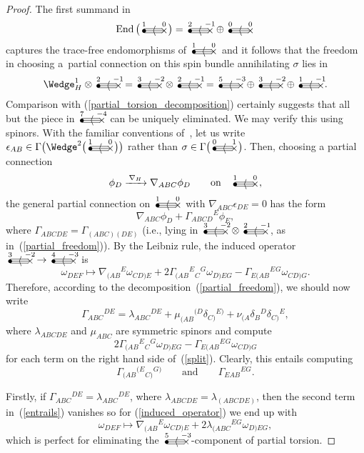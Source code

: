 \documentclass[pdftex]{sigma}%
\numberwithin{equation}{section}
\newcommand{\End}{\operatorname{End}}
\newcommand{\gtwo}[2]{\begin{picture}(28,10)
\put(4,1.1){\makebox(0,0){$\bullet$}}
\put(24,1.5){\makebox(0,0){$\times$}}
\put(4,3.5){\line(1,0){18}}
\put(4,1.5){\line(1,0){20}}
\put(4,-.5){\line(1,0){18}}
\put(14,1.5){\makebox(0,0){$\langle$}}
\put(4,8){\makebox(0,0){$\scriptstyle #1$}}
\put(24,8){\makebox(0,0){$\scriptstyle #2$}}
\end{picture}}
\begin{document}
\begin{proof}
The first summand in
\[\End\big(\gtwo{1}{0}\big)=\gtwo{2}{-1}\oplus\gtwo{0}{0}\]
captures the trace-free endomorphisms of $\gtwo{1}{0}$ and it follows that the
freedom in choosing a~partial connection on this spin bundle annihilating
$\sigma$ lies in
\begin{equation}\label{partial_freedom}
\Wedge_H^1\otimes\gtwo{2}{-1}=\gtwo{3}{-2}\otimes\gtwo{2}{-1}
=\gtwo{5}{-3}\oplus\gtwo{3}{-2}\oplus\gtwo{1}{-1}.\end{equation}
Comparison with (\ref{partial_torsion_decomposition}) certainly suggests that
all but the piece in $\gtwo{7}{-4}$ can be uniquely eliminated. We may verify
this using spinors. With the familiar conventions of~\cite{OT}, let us write
$\epsilon_{AB}\in\Gamma\big({\Wedge}^2\big(\gtwo{1}{0}\big)\big)$ rather than
$\sigma\in\Gamma\big(\gtwo{0}{1}\big)$. Then,
choosing a partial connection
\[\phi_D\xrightarrow{\,\nabla_H\,}\nabla_{ABC}\phi_D\qquad\mbox{on} \quad
\gtwo{1}{0},\]
the general partial connection on $\gtwo{1}{0}$ with
$\nabla_{ABC}\epsilon_{DE}=0$ has the form
\[\nabla_{ABC}\phi_D+\Gamma_{ABCD}{}^E\phi_E,\]
where $\Gamma_{ABCDE}=\Gamma_{(ABC)(DE)}$ (i.e., lying in
$\gtwo{3}{-2}\otimes\gtwo{2}{-1}$, as in~(\ref{partial_freedom})). By the
Leibniz rule, the induced
operator $\gtwo{3}{-2}\to\gtwo{4}{-3}$ is
\begin{equation}\label{induced_operator}
\omega_{DEF}\longmapsto\nabla_{(AB}{}^E\omega_{CD)E}
+2\Gamma_{(AB}{}^E{}_C{}^G\omega_{D)EG}
-\Gamma_{E(AB}{}^E{}^G\omega_{CD)G}.\end{equation}
Therefore, according to the decomposition~(\ref{partial_freedom}), we should
now write
\begin{equation}\label{split}\Gamma_{ABC}{}^{DE}=\lambda_{ABC}{}^{DE}
+\mu_{(AB}{}^{(D}\delta_{C)}{}^{E)}
+\nu_{(A}\delta_B{}^D\delta_{C)}{}^E,\end{equation}
where $\lambda_{ABCDE}$ and $\mu_{ABC}$ are symmetric spinors and compute
\[2\Gamma_{(AB}{}^E{}_C{}^G\omega_{D)EG}
-\Gamma_{E(AB}{}^E{}^G\omega_{CD)G}\]
for each term on the right hand side of~(\ref{split}). Clearly, this entails
computing
\begin{equation}\label{entrails}
\Gamma_{(AB}{}^{(E}{}_{C)}{}^{G)}\qquad\mbox{and}\qquad
\Gamma_{EAB}{}^{EG}.\end{equation}

Firstly, if $\Gamma_{ABC}{}^{DE}=\lambda_{ABC}{}^{DE}$, where
$\lambda_{ABCDE}=\lambda_{(ABCDE)}$, then the second term in~(\ref{entrails})
vanishes so for (\ref{induced_operator}) we end up with
\[\omega_{DEF}\longmapsto\nabla_{(AB}{}^E\omega_{CD)E}
+2\lambda_{(ABC}{}^{EG}\omega_{D)EG},\]
which is perfect for eliminating the $\gtwo{5}{-3}$-component of partial
torsion.


\end{proof}
\end{document}
